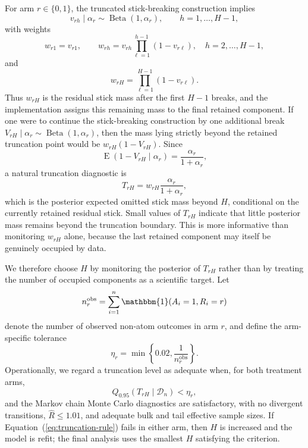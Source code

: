 \documentclass[11pt]{article}
\DeclareMathOperator*{\E}{E}
\DeclareMathOperator*{\Beta}{Beta}
\begin{document}
For arm $r \in \{0,1\}$, the truncated stick-breaking construction implies
\[
  v_{rh} \mid \alpha_r \sim \Beta(1,\alpha_r),
  \qquad
  h = 1,\ldots,H-1,
\]
with weights
\[
  w_{r1} = v_{r1},
  \qquad
  w_{rh} = v_{rh}\prod_{\ell=1}^{h-1}(1-v_{r\ell}),
  \quad h = 2,\ldots,H-1,
\]
and
\[
  w_{rH} = \prod_{\ell=1}^{H-1}(1-v_{r\ell}).
\]
Thus $w_{rH}$ is the residual stick mass after the first $H-1$ breaks, and the implementation assigns this remaining mass to the final retained component. If one were to continue the stick-breaking construction by one additional break $V_{rH} \mid \alpha_r \sim \Beta(1,\alpha_r)$, then the mass lying strictly beyond the retained truncation point would be $w_{rH}(1-V_{rH})$. Since
\[
  \E(1-V_{rH} \mid \alpha_r) = \frac{\alpha_r}{1+\alpha_r},
\]
a natural truncation diagnostic is
\begin{equation}
  T_{rH}
  = w_{rH}\frac{\alpha_r}{1+\alpha_r},
  \label{eq:truncation-diagnostic}
\end{equation}
which is the posterior expected omitted stick mass beyond $H$, conditional on the currently retained residual stick. Small values of $T_{rH}$ indicate that little posterior mass remains beyond the truncation boundary. This is more informative than monitoring $w_{rH}$ alone, because the last retained component may itself be genuinely occupied by data.

We therefore choose $H$ by monitoring the posterior of $T_{rH}$ rather than by treating the number of occupied components as a scientific target. Let
\[
  n_r^{\mathrm{obs}}
  =
  \sum_{i=1}^n \mathbbm{1}(A_i = 1, R_i = r)
\]
denote the number of observed non-atom outcomes in arm $r$, and define the arm-specific tolerance
\[
  \eta_r = \min\!\left\{0.02,\frac{1}{n_r^{\mathrm{obs}}}\right\}.
\]
Operationally, we regard a truncation level as adequate when, for both treatment arms,
\begin{equation}
  Q_{0.95}(T_{rH} \mid \mathcal{D}_n) < \eta_r,
  \label{eq:truncation-rule}
\end{equation}
and the Markov chain Monte Carlo diagnostics are satisfactory, with no divergent transitions, $\widehat{R} \leq 1.01$, and adequate bulk and tail effective sample sizes. If Equation~(\ref{eq:truncation-rule}) fails in either arm, then $H$ is increased and the model is refit; the final analysis uses the smallest $H$ satisfying the criterion.
\end{document}
